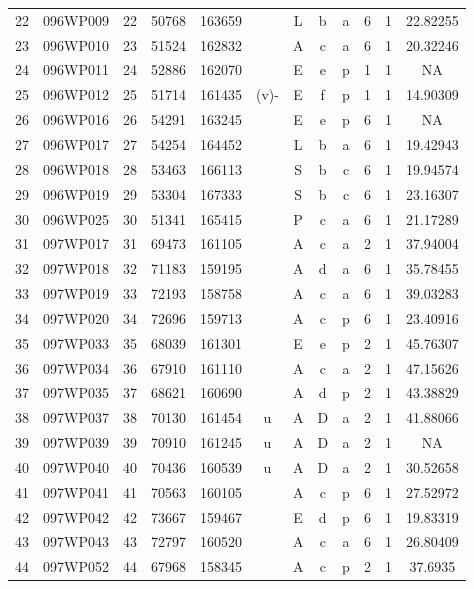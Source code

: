 \begin{tabular}{|*{12}{c|}}
22 & 096WP009 & 22 & 50768 & 163659 &  & L & b & a & 6 & 1 & 22.82255 \\ 
23 & 096WP010 & 23 & 51524 & 162832 &  & A & c & a & 6 & 1 & 20.32246 \\ 
24 & 096WP011 & 24 & 52886 & 162070 &  & E & e & p & 1 & 1 & NA \\ 
25 & 096WP012 & 25 & 51714 & 161435 & (v)- & E & f & p & 1 & 1 & 14.90309 \\ 
26 & 096WP016 & 26 & 54291 & 163245 &  & E & e & p & 6 & 1 & NA \\ 
27 & 096WP017 & 27 & 54254 & 164452 &  & L & b & a & 6 & 1 & 19.42943 \\ 
28 & 096WP018 & 28 & 53463 & 166113 &  & S & b & c & 6 & 1 & 19.94574 \\ 
29 & 096WP019 & 29 & 53304 & 167333 &  & S & b & c & 6 & 1 & 23.16307 \\ 
30 & 096WP025 & 30 & 51341 & 165415 &  & P & c & a & 6 & 1 & 21.17289 \\ 
31 & 097WP017 & 31 & 69473 & 161105 &  & A & c & a & 2 & 1 & 37.94004 \\ 
32 & 097WP018 & 32 & 71183 & 159195 &  & A & d & a & 6 & 1 & 35.78455 \\ 
33 & 097WP019 & 33 & 72193 & 158758 &  & A & c & a & 6 & 1 & 39.03283 \\ 
34 & 097WP020 & 34 & 72696 & 159713 &  & A & c & p & 6 & 1 & 23.40916 \\ 
35 & 097WP033 & 35 & 68039 & 161301 &  & E & e & p & 2 & 1 & 45.76307 \\ 
36 & 097WP034 & 36 & 67910 & 161110 &  & A & c & a & 2 & 1 & 47.15626 \\ 
37 & 097WP035 & 37 & 68621 & 160690 &  & A & d & p & 2 & 1 & 43.38829 \\ 
38 & 097WP037 & 38 & 70130 & 161454 & u & A & D & a & 2 & 1 & 41.88066 \\ 
39 & 097WP039 & 39 & 70910 & 161245 & u & A & D & a & 2 & 1 & NA \\ 
40 & 097WP040 & 40 & 70436 & 160539 & u & A & D & a & 2 & 1 & 30.52658 \\ 
41 & 097WP041 & 41 & 70563 & 160105 &  & A & c & p & 6 & 1 & 27.52972 \\ 
42 & 097WP042 & 42 & 73667 & 159467 &  & E & d & p & 6 & 1 & 19.83319 \\ 
43 & 097WP043 & 43 & 72797 & 160520 &  & A & c & a & 6 & 1 & 26.80409 \\ 
44 & 097WP052 & 44 & 67968 & 158345 &  & A & c & p & 2 & 1 & 37.6935 \\ 

\end{tabular}
